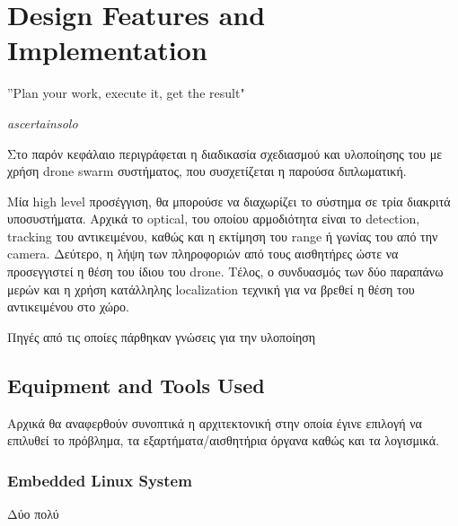 \chapter{Design Features and Implementation} %
\label{chap:Chapter4}  %


\epigraph{”Plan your work, execute it, get the result" }{\textit{ascertainsolo}}

Στο παρόν κεφάλαιο περιγράφεται η διαδικασία σχεδιασμού και υλοποίησης του  με χρήση drone swarm συστήματος, 
που συσχετίζεται η παρούσα διπλωματική. 

Μία high level προσέγγιση, θα μπορούσε να διαχωρίζει το σύστημα σε τρία διακριτά
υποσυστήματα. Αρχικά το optical, του οποίου αρμοδιότητα είναι το detection, tracking του αντικειμένου, καθώς και η εκτίμηση
του range ή γωνίας του από την camera. Δεύτερο, η λήψη των πληροφοριών από τους αισθητήρες ώστε να προσεγγιστεί η θέση του ίδιου
του drone. Τέλος, ο συνδυασμός των δύο παραπάνω μερών και η χρήση κατάλληλης localization τεχνική για να βρεθεί η θέση του αντικειμένου
στο  χώρο.

Πηγές από τις οποίες πάρθηκαν γνώσεις για την υλοποίηση 

\section{Equipment and Tools Used} \label{sec:design-tools}
Αρχικά θα αναφερθούν συνοπτικά η αρχιτεκτονική στην οποία έγινε επιλογή να επιλυθεί το πρόβλημα,
τα εξαρτήματα/αισθητήρια όργανα καθώς και τα λογισμικά. 

\subsection{Embedded Linux System}
Δύο πολύ 

